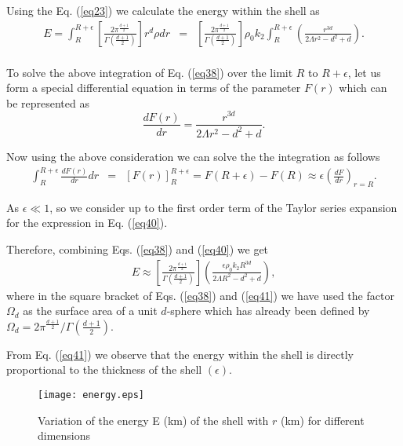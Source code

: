 \documentclass[preprint,12pt]{elsarticle}
\begin{document}
Using the Eq. (\ref{eq23}) we calculate the energy within the shell as
\begin{eqnarray}
E  =   \int _{R}^{R+\epsilon}\left[\frac{2 \pi^{\frac{d+1}{2}} }
{\Gamma \left(\frac{d+1}{2}\right)}\right]r^d \rho dr
&=& \left[ \frac{2 \pi^{\frac{d+1}{2}} }{\Gamma\left(\frac{d+1}{2}\right)}\right]\rho_0 k_2 \int _{R}^{R+\epsilon}  \left(\frac{r^{3d}}{2\Lambda r^2 -d^2+d}\right). \nonumber\\ \label{eq38}
 \end{eqnarray}

To solve the above integration of Eq. (\ref{eq38}) over the limit $R$ to $R+\epsilon$, let us form
a special differential equation in terms of the parameter $F(r)$ which can be represented as
 \begin{equation}
 \frac{dF(r)}{dr}=\frac{r^{3d}}{2\Lambda r^2 -d^2+d}. \label{eq39}
 \end{equation}

Now using the above consideration we can solve the the integration as follows
\begin{eqnarray}
\int _{R}^{R+\epsilon}\frac{dF(r)}{dr}dr &=&[F(r)]_R^{R+\epsilon} = F(R+\epsilon)-F(R) \approx \epsilon \left(\frac{dF}{dr}\right)_{r=R}. \label{eq40}
 \end{eqnarray}

As $\epsilon\ll 1$, so we consider up to the first order term of the Taylor series expansion for the expression in Eq. (\ref{eq40}).

Therefore, combining Eqs. (\ref{eq38}) and (\ref{eq40}) we get
\begin{eqnarray}
E \approx \left[\frac{2 \pi^{\frac{d+1}{2}} }{\Gamma\left(\frac{d+1}{2}\right)}\right]  \left(\frac{\epsilon \rho_0 k_2 R^{3d}}{2\Lambda R^2 -d^2+d}\right),\label{eq41}
\end{eqnarray}
where in the square bracket of Eqs. (\ref{eq38}) and (\ref{eq41}) we have used the factor ${\Omega}_d$ as the surface area
of a unit $d$-sphere which has already been defined by ${\Omega}_d =2 \pi^{\frac{d+1}{2}}/\Gamma(\frac{d+1}{2})$.

From Eq. (\ref{eq41}) we observe that the energy within the shell is directly proportional to the thickness of the
shell $(\epsilon)$.


\begin{figure*}[thbp]
\centering
\texttt{[image: energy.eps]}
\caption{Variation of the energy E (km) of the shell with $r$ (km) for different dimensions }
\end{figure*}
\end{document}
